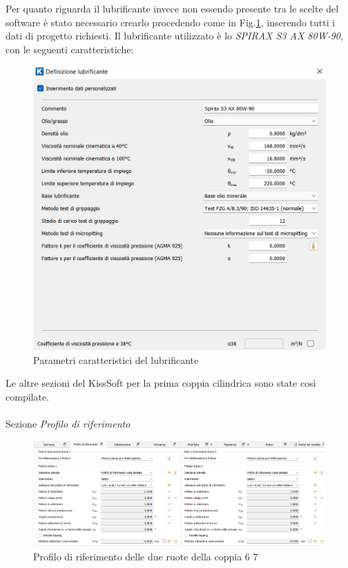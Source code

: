 Per quanto riguarda il lubrificante invece non essendo presente tra le scelte del software è stato necessario crearlo procedendo come in Fig.\ref{fig:LubrificanteCoppia45}, inserendo tutti i dati di progetto richiesti. Il lubrificante utilizzato è lo \textit{SPIRAX S3 AX 80W-90}, con le seguenti caratteristiche: 
\begin{figure}[h]
    \centering
    \includegraphics[scale=0.35]{Immagini/LubrificanteCoppia45.png}
    \caption{Parametri caratteristici del lubrificante}
    \label{fig:LubrificanteCoppia45}
\end{figure}

Le altre sezioni del KissSoft per la prima coppia cilindrica sono state così compilate.\\
\\
Sezione \emph{Profilo di riferimento}
\begin{figure}[h]
    \centering
    \includegraphics[scale=0.5]{Immagini/ProfiloRiferimentoCoppia67.png}
    \caption{Profilo di riferimento delle due ruote della coppia 6 7}
    \label{fig:ProfiloRiferimentoCoppia67}
\end{figure}

